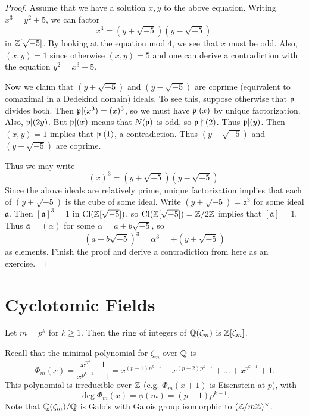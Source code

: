 \begin{proof}
  Assume that we have a solution $x, y$ to the
  above equation. Writing $x^3 = y^2 + 5$, we
  can factor
  \[
    x^3 = (y + \sqrt{-5})(y - \sqrt{-5}).
  \]
  in $\mathbb{Z}[\sqrt{-5}]$. By looking at the equation
  mod $4$, we see that $x$ must be odd.
  Also, $(x, y) = 1$ since otherwise $(x, y) = 5$
  and one can derive a contradiction with the
  equation $y^2 = x^3 - 5$.

  Now we claim that
  $(y + \sqrt{-5})$ and $(y - \sqrt{-5})$ are
  coprime (equivalent to comaximal in a Dedekind
  domain) ideals. To see this, suppose otherwise
  that $\mathfrak{p}$ divides both. Then $\mathfrak{p} | (x^3) = (x)^3$,
  so we must have $\mathfrak{p} | (x)$ by unique factorization.
  Also, $\mathfrak{p} | (2y)$. But $\mathfrak{p} | (x)$ means that
  $N(\mathfrak{p})$ is odd, so $\mathfrak{p} \nmid (2)$. Thus
  $\mathfrak{p} | (y)$. Then $(x, y) = 1$ implies that
  $\mathfrak{p} | (1)$, a contradiction. Thus
  $(y + \sqrt{-5})$ and $(y - \sqrt{-5})$ are
  coprime.

  Thus we may write
  \[
    (x)^3 = (y + \sqrt{-5})(y - \sqrt{-5}).
  \]
  Since the above ideals are relatively prime,
  unique factorization implies that each of
  $(y \pm \sqrt{-5})$ is the cube of some ideal. 
  Write $(y + \sqrt{-5}) = \mathfrak{a}^3$ for some ideal
  $\mathfrak{a}$. Then $[\mathfrak{a}]^3 = 1$
  in $\operatorname{Cl}(\mathbb{Z}[\sqrt{-5}])$, so
  $\operatorname{Cl}(\mathbb{Z}[\sqrt{-5}]) = \mathbb{Z} / 2\mathbb{Z}$ implies that
  $[\mathfrak{a}] = 1$. Thus $\mathfrak{a} = (\alpha)$
  for some $\alpha = a + b \sqrt{-5}$, so
  \[
    (a + b \sqrt{-5})^3
    = \alpha^3 = \pm (y + \sqrt{-5})
  \]
  as elements. Finish the proof and derive a
  contradiction from here as an exercise.
\end{proof}

\section{Cyclotomic Fields}

\begin{theorem}\label{thm:cyclotomic-prime-powers}
  Let $m = p^k$ for $k \ge 1$. Then the ring of
  integers of $\mathbb{Q}(\zeta_m)$ is $\mathbb{Z}[\zeta_m]$.
\end{theorem}

\begin{remark}
  Recall that the minimal polynomial for
  $\zeta_m$ over $\mathbb{Q}$ is
  \[
    \Phi_m(x) = \frac{x^{p^k} - 1}{x^{p^{k - 1}} - 1}
    = x^{(p - 1)p^{k - 1}} + x^{(p - 2)p^{k - 1}} + \dots + x^{p^{k - 1}} + 1.
  \]
  This polynomial is irreducible
  over $\mathbb{Z}$ (e.g. $\Phi_m(x + 1)$ is Eisenstein at $p$),
  with
  \[
    \deg \Phi_m(x) = \phi(m) = (p - 1)p^{k - 1}.
  \]
  Note that $\mathbb{Q}(\zeta_m) / \mathbb{Q}$ is Galois
  with Galois group isomorphic to $(\mathbb{Z} / m\mathbb{Z})^\times$.
\end{remark}

